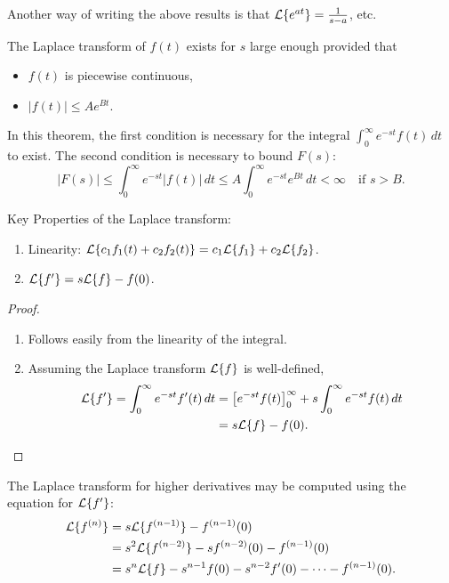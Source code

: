 Another way of writing the above results is that $\mathcal{L}\{e^{at}\} = \frac{1}{s-a}$, etc.

\begin{theorem}
	The Laplace transform of $f(t)$ exists for $s$ large enough provided that
	\begin{itemize}
		\item $f(t)$ is piecewise continuous,
		\item $|f(t)| \leq Ae^{Bt}$.
	\end{itemize}
\end{theorem}

In this theorem, the first condition is necessary for the integral $\int_0^{\infty} e^{-st}f(t)\,dt$ to exist. The second condition is necessary to bound $F(s)$:
\[
|F(s)| \leq \int_0^{\infty} e^{-st}|f(t)|\,dt \leq A\int_0^{\infty} e^{-st}e^{Bt}\,dt < \infty \quad\text{if } s>B.
\]

Key Properties of the Laplace transform:
\begin{enumerate}
	\item Linearity: $\mathcal{L}\{c_1f_1(t) + c_2f_2(t)\} = c_1\mathcal{L}\{f_1\} + c_2\mathcal{L}\{f_2\}$.
	\item $\mathcal{L}\{f'\} = s\mathcal{L}\{f\} - f(0)$.
\end{enumerate}

\begin{proof}\hfill
	\begin{enumerate}
		\item Follows easily from the linearity of the integral.
		\item Assuming the Laplace transform $\mathcal{L}\{f\}$ is well-defined,
		\begin{align*}
			\mathcal{L}\{f'\} = \int_0^{\infty} e^{-st}f'(t)\,dt &= \left[e^{-st}f(t)\right]_0^{\infty} + s\int_0^{\infty} e^{-st}f(t)\,dt \\
			&= s\mathcal{L}\{f\} - f(0).
		\end{align*}
	\end{enumerate}
\end{proof}

The Laplace transform for higher derivatives may be computed using the equation for $\mathcal{L}\{f'\}$:
\begin{align*}
	\mathcal{L}\{f^{(n)}\} &= s\mathcal{L}\{f^{(n-1)}\} - f^{(n-1)}(0) \\
	&= s^2\mathcal{L}\{f^{(n-2)}\} - sf^{(n-2)}(0) - f^{(n-1)}(0) \\
	&= s^n\mathcal{L}\{f\} - s^{n-1}f(0) - s^{n-2}f'(0) - \cdots - f^{(n-1)}(0).
\end{align*}

